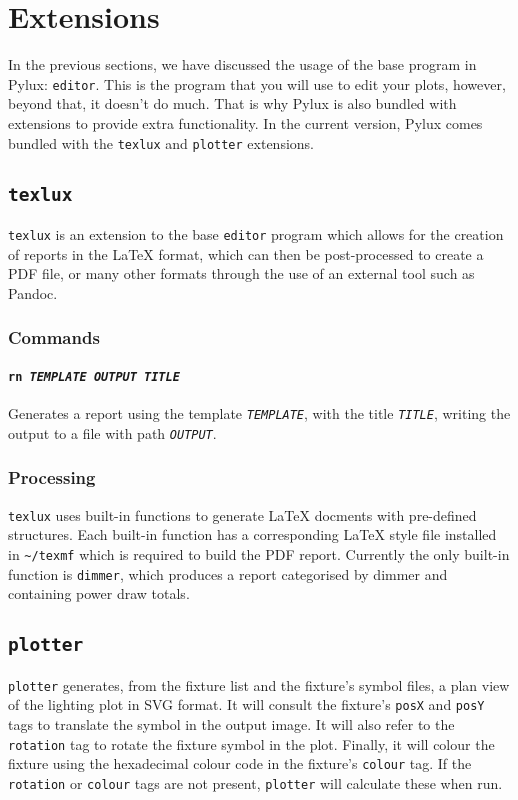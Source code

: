 \documentclass[a4paper]{article}
\begin{document}
\section{Extensions}
In the previous sections, we have discussed the usage of the base program in 
Pylux: \texttt{editor}. This is the program that you will use to edit your
plots, however, beyond that, it doesn't do much. That is why Pylux is also 
bundled with extensions to provide extra functionality. In the current 
version, Pylux comes bundled with the \texttt{texlux} and \texttt{plotter} 
extensions.

\subsection{\texttt{texlux}}
\texttt{texlux} is an extension to the base \texttt{editor} program which 
allows for the creation of reports in the \LaTeX{} format, which can then be 
post-processed to create a PDF file, or many other formats through the use 
of an external tool such as Pandoc.

\subsubsection{Commands}

\paragraph{\texttt{rn \textit{TEMPLATE OUTPUT TITLE}}}
Generates a report using the template \texttt{\textit{TEMPLATE}}, with the 
title \texttt{\textit{TITLE}}, writing the output to a file with path 
\texttt{\textit{OUTPUT}}.

\subsubsection{Processing}

\texttt{texlux} uses built-in functions to generate \LaTeX{} docments with 
pre-defined structures. Each built-in function has a corresponding \LaTeX{} 
style file installed in \texttt{\~{}/texmf} which is required to build 
the PDF report. Currently the only built-in function is \texttt{dimmer}, 
which produces a report categorised by dimmer and containing power draw 
totals.

\subsection{\texttt{plotter}}
\texttt{plotter} generates, from the fixture list and the fixture's symbol 
files, a plan view of the lighting plot in SVG format. It will consult the 
fixture's \texttt{posX} and \texttt{posY} tags to translate the symbol in 
the output image. It will also refer to the \texttt{rotation} tag to rotate 
the fixture symbol in the plot. Finally, it will colour the fixture using 
the hexadecimal colour code in the fixture's \texttt{colour} tag. If the 
\texttt{rotation} or \texttt{colour} tags are not present, \texttt{plotter} 
will calculate these when run.
\end{document}
